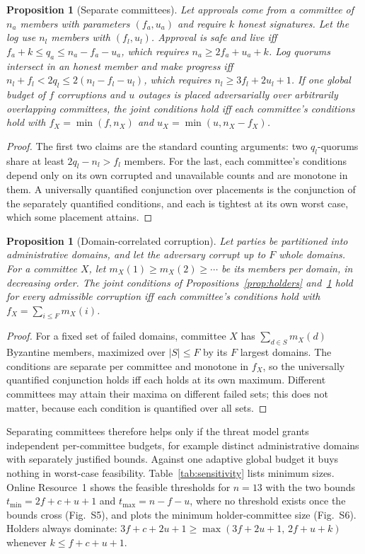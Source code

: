 \documentclass[pdflatex,sn-mathphys-num]{sn-jnl}%
\theoremstyle{plain}
\newtheorem{proposition}[theorem]{Proposition}
\theoremstyle{definition}
\begin{document}
\begin{proposition}[Separate committees]\label{prop:committees}
Let approvals come from a committee of $n_a$ members with parameters $(f_a,u_a)$ and require $k$ honest signatures. Let the log use $n_l$ members with $(f_l,u_l)$. Approval is safe and live iff $f_a+k\le q_a\le n_a-f_a-u_a$, which requires $n_a\ge2f_a+u_a+k$. Log quorums intersect in an honest member and make progress iff $n_l+f_l<2q_l\le2(n_l-f_l-u_l)$, which requires $n_l\ge3f_l+2u_l+1$. If one global budget of $f$ corruptions and $u$ outages is placed adversarially over arbitrarily overlapping committees, the joint conditions hold iff each committee's conditions hold with $f_X=\min(f,n_X)$ and $u_X=\min(u,n_X-f_X)$.
\end{proposition}
\begin{proof}
The first two claims are the standard counting arguments: two $q_l$-quorums share at least $2q_l-n_l>f_l$ members. For the last, each committee's conditions depend only on its own corrupted and unavailable counts and are monotone in them. A universally quantified conjunction over placements is the conjunction of the separately quantified conditions, and each is tightest at its own worst case, which some placement attains.
\end{proof}

\begin{proposition}[Domain-correlated corruption]\label{prop:domains}
Let parties be partitioned into administrative domains, and let the adversary corrupt up to $F$ whole domains. For a committee $X$, let $m_X(1)\ge m_X(2)\ge\cdots$ be its members per domain, in decreasing order. The joint conditions of Propositions~\ref{prop:holders} and~\ref{prop:committees} hold for every admissible corruption iff each committee's conditions hold with $f_X=\sum_{i\le F}m_X(i)$.
\end{proposition}
\begin{proof}
For a fixed set of failed domains, committee $X$ has $\sum_{d\in S}m_X(d)$ Byzantine members, maximized over $|S|\le F$ by its $F$ largest domains. The conditions are separate per committee and monotone in $f_X$, so the universally quantified conjunction holds iff each holds at its own maximum. Different committees may attain their maxima on different failed sets; this does not matter, because each condition is quantified over all sets.
\end{proof}

Separating committees therefore helps only if the threat model grants independent per-committee budgets, for example distinct administrative domains with separately justified bounds. Against one adaptive global budget it buys nothing in worst-case feasibility. Table~\ref{tab:sensitivity} lists minimum sizes. Online Resource~1 shows the feasible thresholds for $n=13$ with the two bounds $t_{\min}=2f+c+u+1$ and $t_{\max}=n-f-u$, where no threshold exists once the bounds cross (Fig.~S5), and plots the minimum holder-committee size (Fig.~S6). Holders always dominate: $3f+c+2u+1\ge\max(3f+2u+1,\,2f+u+k)$ whenever $k\le f+c+u+1$.
\end{document}
